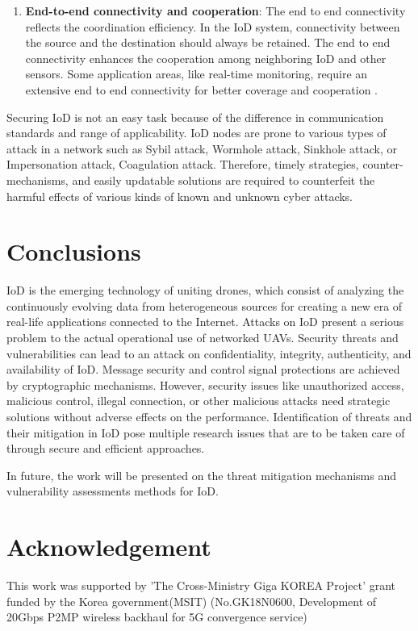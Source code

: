 \documentclass{easychair}
\begin{document}
\begin{enumerate}
\item  \textbf{End-to-end connectivity and cooperation}:  The end to end connectivity reflects the coordination efficiency. In the IoD system, connectivity between the source and the destination should always be retained. The end to end connectivity enhances the cooperation among neighboring IoD and other sensors. Some application areas, like real-time monitoring, require an extensive end to end connectivity for better coverage and cooperation \cite{orsino2017effects}.
\end{enumerate}

Securing IoD is not an easy task because of the difference in communication standards and range of applicability. IoD nodes are prone to various types of attack in a network such as Sybil attack, Wormhole attack, Sinkhole attack, or Impersonation attack, Coagulation attack\cite{sharmacoagulation}. Therefore, timely strategies, counter-mechanisms, and easily updatable solutions are required to counterfeit the harmful effects of various kinds of known and unknown cyber attacks.

\section{Conclusions}
\label{sect:Conclusions}
IoD is the emerging technology of uniting drones, which consist of analyzing the continuously evolving data from heterogeneous sources for creating a new era of real-life applications connected to the Internet. Attacks on IoD present a serious problem to the actual operational use of networked UAVs. Security threats and vulnerabilities can lead to an attack on confidentiality, integrity, authenticity, and availability of IoD. Message security and control signal protections are achieved by cryptographic mechanisms. However, security issues like unauthorized access, malicious control, illegal connection, or other malicious attacks need strategic solutions without adverse effects on the performance. Identification of threats and their mitigation in IoD pose multiple research issues that are to be taken care of through secure and efficient approaches.

In future, the work will be presented on the threat mitigation mechanisms and vulnerability assessments methods for IoD.
\section*{Acknowledgement}
This work was supported by 'The Cross-Ministry Giga KOREA Project' grant funded by the Korea government(MSIT) (No.GK18N0600, Development of 20Gbps P2MP wireless backhaul for 5G convergence service)
\end{document}

